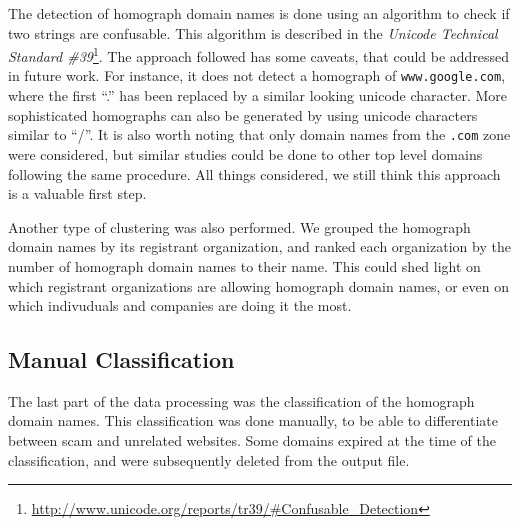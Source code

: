 \documentclass[letterpaper,twocolumn,10pt]{article}
\begin{document}
The detection of homograph domain names is done using an algorithm to check if two strings are confusable.
This algorithm is described in the \textit{Unicode Technical Standard \#39}\footnote{\url{http://www.unicode.org/reports/tr39/#Confusable_Detection}}.
The approach followed has some caveats, that could be addressed in future work.
For instance, it does not detect a homograph of \texttt{www.google.com}, where the first ``.'' has been replaced by a similar looking unicode character.
More sophisticated homographs can also be generated by using unicode characters similar to ``/''.
It is also worth noting that only domain names from the \texttt{.com} zone were considered, but similar studies could be done to other top level domains following the same procedure.
All things considered, we still think this approach is a valuable first step.

Another type of clustering was also performed.
We grouped the homograph domain names by its registrant organization, and ranked each organization by the number of homograph domain names to their name.
This could shed light on which registrant organizations are allowing homograph domain names, or even on which indivuduals and companies are doing it the most.

\subsection{Manual Classification}
The last part of the data processing was the classification of the homograph domain names.
This classification was done manually, to be able to differentiate between scam and unrelated websites.
Some domains expired at the time of the classification, and were subsequently deleted from the output file.
\end{document}
